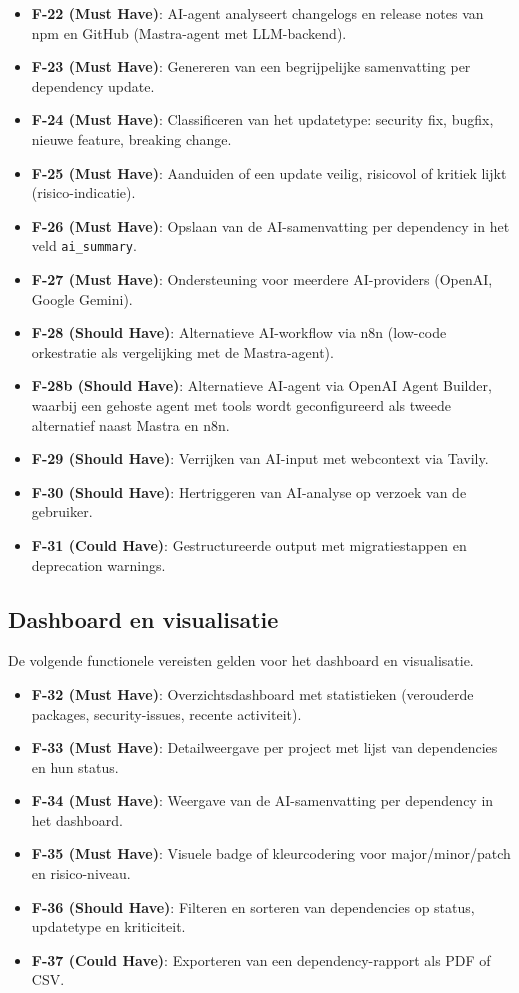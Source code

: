 \begin{itemize}
  \item \textbf{F-22 (Must Have)}: AI-agent analyseert changelogs en release notes van npm en GitHub (Mastra-agent met LLM-backend).
  \item \textbf{F-23 (Must Have)}: Genereren van een begrijpelijke samenvatting per dependency update.
  \item \textbf{F-24 (Must Have)}: Classificeren van het updatetype: security fix, bugfix, nieuwe feature, breaking change.
  \item \textbf{F-25 (Must Have)}: Aanduiden of een update veilig, risicovol of kritiek lijkt (risico-indicatie).
  \item \textbf{F-26 (Must Have)}: Opslaan van de AI-samenvatting per dependency in het veld \texttt{ai\_summary}.
  \item \textbf{F-27 (Must Have)}: Ondersteuning voor meerdere AI-providers (OpenAI, Google Gemini).
  \item \textbf{F-28 (Should Have)}: Alternatieve AI-workflow via n8n (low-code orkestratie als vergelijking met de Mastra-agent).
  \item \textbf{F-28b (Should Have)}: Alternatieve AI-agent via OpenAI Agent Builder, waarbij een gehoste agent met tools wordt geconfigureerd als tweede alternatief naast Mastra en n8n.
  \item \textbf{F-29 (Should Have)}: Verrijken van AI-input met webcontext via Tavily.
  \item \textbf{F-30 (Should Have)}: Hertriggeren van AI-analyse op verzoek van de gebruiker.
  \item \textbf{F-31 (Could Have)}: Gestructureerde output met migratiestappen en deprecation warnings.
\end{itemize}


\subsection{Dashboard en visualisatie}
\label{sec:dashboard}

De volgende functionele vereisten gelden voor het dashboard en visualisatie.

\begin{itemize}
  \item \textbf{F-32 (Must Have)}: Overzichtsdashboard met statistieken (verouderde packages, security-issues, recente activiteit).
  \item \textbf{F-33 (Must Have)}: Detailweergave per project met lijst van dependencies en hun status.
  \item \textbf{F-34 (Must Have)}: Weergave van de AI-samenvatting per dependency in het dashboard.
  \item \textbf{F-35 (Must Have)}: Visuele badge of kleurcodering voor major/minor/patch en risico-niveau.
  \item \textbf{F-36 (Should Have)}: Filteren en sorteren van dependencies op status, updatetype en kriticiteit.
  \item \textbf{F-37 (Could Have)}: Exporteren van een dependency-rapport als PDF of CSV.
\end{itemize}


